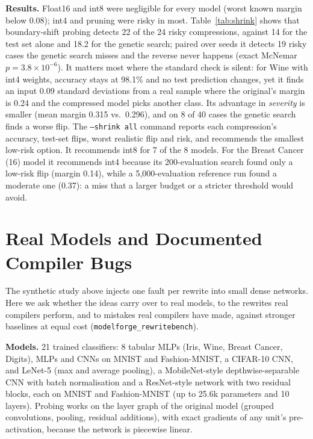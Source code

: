\documentclass[conference]{IEEEtran}
\begin{document}
\textbf{Results.} Float16 and int8 were negligible for every model (worst known margin below 0.08); int4 and pruning were risky in most. Table~\ref{tab:shrink} shows that boundary-shift probing detects 22 of the 24 risky compressions, against 14 for the test set alone and 18.2 for the genetic search; paired over seeds it detects 19 risky cases the genetic search misses and the reverse never happens (exact McNemar $p=3.8\times10^{-6}$). It matters most where the standard check is silent: for Wine with int4 weights, accuracy stays at 98.1\% and no test prediction changes, yet it finds an input 0.09 standard deviations from a real sample where the original's margin is 0.24 and the compressed model picks another class. Its advantage in \emph{severity} is smaller (mean margin 0.315 vs.\ 0.296), and on 8 of 40 cases the genetic search finds a worse flip. The \texttt{--shrink all} command reports each compression's accuracy, test-set flips, worst realistic flip and risk, and recommends the smallest low-risk option. It recommends int8 for 7 of the 8 models. For the Breast Cancer (16) model it recommends int4 because its 200-evaluation search found only a low-risk flip (margin 0.14), while a 5{,}000-evaluation reference run found a moderate one (0.37): a miss that a larger budget or a stricter threshold would avoid.

\section{Real Models and Documented Compiler Bugs}\label{sec:real}
The synthetic study above injects one fault per rewrite into small dense networks. Here we ask whether the ideas carry over to real models, to the rewrites real compilers perform, and to mistakes real compilers have made, against stronger baselines at equal cost (\texttt{modelforge\_rewritebench}).

\textbf{Models.} 21 trained classifiers: 8 tabular MLPs (Iris, Wine, Breast Cancer, Digits), MLPs and CNNs on MNIST and Fashion-MNIST, a CIFAR-10 CNN, and LeNet-5 (max and average pooling), a MobileNet-style depthwise-separable CNN with batch normalisation and a ResNet-style network with two residual blocks, each on MNIST and Fashion-MNIST (up to 25.6k parameters and 10 layers). Probing works on the layer graph of the original model (grouped convolutions, pooling, residual additions), with exact gradients of any unit's pre-activation, because the network is piecewise linear.
\end{document}
